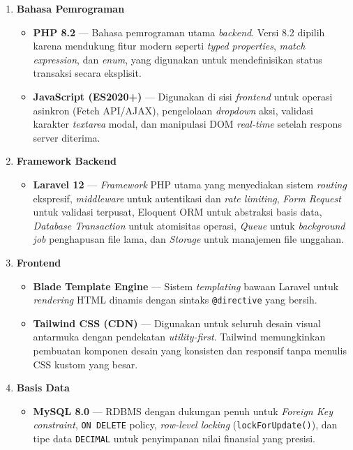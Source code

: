 \documentclass[11pt, a5paper]{article}
\begin{document}
\begin{enumerate}[label=\arabic*.]
  \item \textbf{Bahasa Pemrograman}
    \begin{itemize}
      \item \textbf{PHP 8.2} --- Bahasa pemrograman utama \textit{backend}.
            Versi 8.2 dipilih karena mendukung fitur modern seperti \textit{typed
            properties}, \textit{match expression}, dan \textit{enum}, yang
            digunakan untuk mendefinisikan status transaksi secara eksplisit.
      \item \textbf{JavaScript (ES2020+)} --- Digunakan di sisi \textit{frontend}
            untuk operasi asinkron (Fetch API/AJAX), pengelolaan \textit{dropdown}
            aksi, validasi karakter \textit{textarea} modal, dan manipulasi DOM
            \textit{real-time} setelah respons server diterima.
    \end{itemize}

  \item \textbf{Framework Backend}
    \begin{itemize}
      \item \textbf{Laravel 12} --- \textit{Framework} PHP utama yang menyediakan
            sistem \textit{routing} ekspresif, \textit{middleware} untuk
            autentikasi dan \textit{rate limiting}, \textit{Form Request} untuk
            validasi terpusat, Eloquent ORM untuk abstraksi basis data,
            \textit{Database Transaction} untuk atomisitas operasi, \textit{Queue}
            untuk \textit{background job} penghapusan file lama, dan
            \textit{Storage} untuk manajemen file unggahan.
    \end{itemize}

  \item \textbf{Frontend}
    \begin{itemize}
      \item \textbf{Blade Template Engine} --- Sistem \textit{templating}
            bawaan Laravel untuk \textit{rendering} HTML dinamis dengan sintaks
            \texttt{@directive} yang bersih.
      \item \textbf{Tailwind CSS (CDN)} --- Digunakan untuk seluruh desain visual
            antarmuka dengan pendekatan \textit{utility-first}. Tailwind
            memungkinkan pembuatan komponen desain yang konsisten dan responsif
            tanpa menulis CSS kustom yang besar.
    \end{itemize}

  \item \textbf{Basis Data}
    \begin{itemize}
      \item \textbf{MySQL 8.0} --- RDBMS dengan dukungan penuh untuk
            \textit{Foreign Key constraint}, \texttt{ON DELETE} policy,
            \textit{row-level locking} (\texttt{lockForUpdate()}), dan tipe data
            \texttt{DECIMAL} untuk penyimpanan nilai finansial yang presisi.
    \end{itemize}


\end{enumerate}
\end{document}
